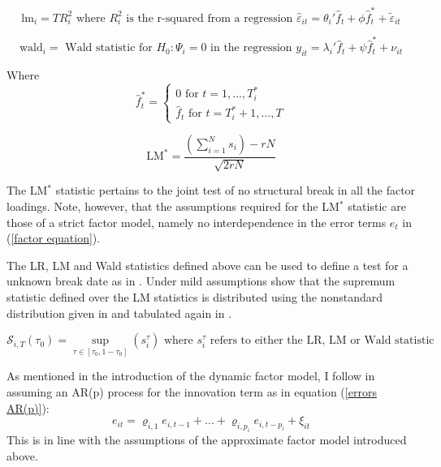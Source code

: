 \documentclass[12pt]{article}
\begin{document}
\begin{equation}
	\label{LM-Statistic}
	\text{lm}_i = T R^2_i \text{ where $R_i^2$ is the r-squared from a regression } \hat \varepsilon_{it} = \theta_i' \hat f_t + \phi \hat f_t^* + \tilde \varepsilon_{it}
\end{equation}

\begin{equation}
	\label{Wald-Statistic}
	\text{wald}_i = \text{ Wald statistic for $H_0: \Psi_i = 0$ in the regression } y_{it} = \lambda_i' \hat f_t + \psi \hat f_t^* + \nu_{it}
\end{equation}

Where 
$$\hat f_t^* = \begin{cases} 0 \text{ for } t=1, ..., T_i^* \\ \hat f_t \text{ for } t=T_i^*+1, ..., T \end{cases}$$

\begin{equation}
	\label{LM-Statistic}
	\text{LM}^* = \frac{\left( \sum_{i=1}^N s_i \right) -rN}{\sqrt{2rN}}
\end{equation}

The LM$^*$ statistic pertains to the joint test of no structural break in all the factor loadings. Note, however, that the assumptions required for the LM$^*$ statistic are those of a strict factor model, namely no interdependence in the error terms $e_t$ in (\ref{factor equation}).

The LR, LM and Wald statistics defined above can be used to define a test for a unknown break date as in \citet{andrews1993tests}. Under mild assumptions \citet{breitung2011testing} show that the supremum statistic defined over the LM statistics is distributed using the nonstandard distribution given in \citet{andrews1993tests} and tabulated again in \citet{andrews2003tests}.

\begin{equation}
\label{sup LM statistic}
\mathscr{S}_{i,T}(\tau_0) = \sup_{\tau \in [\tau_0, 1-\tau_0]} (s_i^\tau) \text{ where $s_i^\tau$ refers to either the LR, LM or Wald statistic}
\end{equation}



As mentioned in the introduction of the dynamic factor model, I follow \citet{breitung2011testing} in assuming an AR(p) process for the innovation term as in equation (\ref{errors AR(p)}):
\begin{equation}
	\label{errors AR(p)}
	e_{it} = \varrho_{i, 1} e_{i, t-1} + ... + \varrho_{i, p_i} e_{i, t-p_i} + \xi_{it}
\end{equation}
This is in line with the assumptions of the approximate factor model introduced above.
\end{document}
